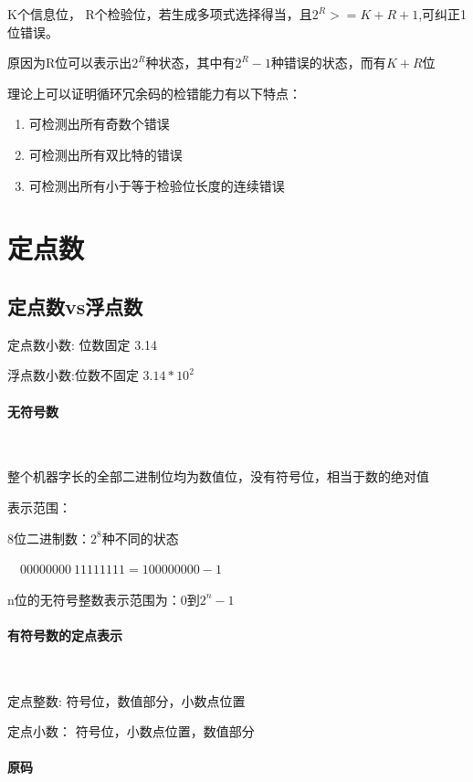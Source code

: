 \documentclass[12pt]{ctexart}
\begin{document}
K个信息位， R个检验位，若生成多项式选择得当，且$2^{R} >= K + R + 1$,可纠正1位错误。

原因为R位可以表示出$2^{R}$种状态，其中有$2^{R}-1$种错误的状态，而有$K+R$位

理论上可以证明循环冗余码的检错能力有以下特点：
\begin{enumerate}
    \item 可检测出所有奇数个错误
    \item 可检测出所有双比特的错误
    \item 可检测出所有小于等于检验位长度的连续错误
\end{enumerate}

\newpage
\section{定点数}

\subsection{定点数vs浮点数}
定点数小数: 位数固定  \hspace{15ex}3.14

浮点数小数:位数不固定 \hspace{13ex}$3.14 * 10^{2}$

\paragraph{无符号数}~{}

整个机器字长的全部二进制位均为数值位，没有符号位，相当于数的绝对值


表示范围：


8位二进制数：$2^{8}$种不同的状态

$
\quad 00000000~1111 1111 = 100000000-1
$


n位的无符号整数表示范围为：0到$2^{n}-1$

\paragraph{有符号数的定点表示}~{}

定点整数:\hspace{3ex} 符号位，数值部分，小数点位置

定点小数：\hspace{3ex} 符号位，小数点位置，数值部分

\paragraph{原码}~{}
\end{document}
